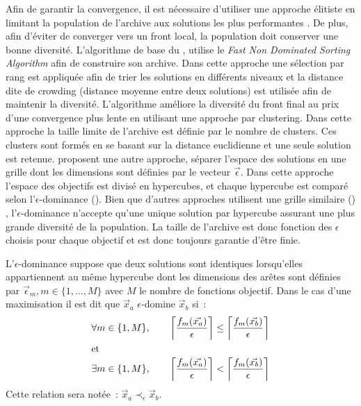 Afin de garantir la convergence, il est nécessaire d’utiliser une approche élitiste
en limitant la population de l’archive aux solutions les plus performantes \parencite{Zitzler2000173}.
De plus, afin d’éviter de converger vers un front local, la population doit conserver
une bonne diversité.
L’algorithme de base du  \parencite{Deb2002182}, utilise le \textit{Fast
Non Dominated Sorting Algorithm} afin de construire son archive. Dans cette approche une
sélection par rang est appliquée afin de trier les solutions en différents niveaux et la
distance dite de crowding (distance moyenne entre deux solutions) est utilisée afin de
maintenir la diversité. L’algorithme  améliore la diversité du
front final au prix d’une convergence plus lente en utilisant une approche par clustering.
Dans cette approche la taille limite de l’archive est définie par le nombre de clusters.
Ces clusters sont formés en se basant sur la distance euclidienne et une seule solution
est retenue.
\textcite{Laumanns2002263} proposent une autre approche, séparer l’espace des solutions en une
grille dont les dimensions sont définies par le vecteur $\vec{\epsilon}$. Dans cette
approche l’espace des objectifs est divisé en hypercubes, et chaque hypercube est comparé
selon l’$\epsilon$-dominance (). Bien que d’autres
approches utilisent une grille similaire () \parencite{Knowles2000149},
l’$\epsilon$-dominance n’accepte qu’une unique solution par hypercube assurant une plus
grande diversité de la population. La taille de l’archive est donc fonction des $\epsilon$
choisis pour chaque objectif et est donc toujours garantie d’être finie.


\begin{Def}\label{def:eps_dominance}
L’$\epsilon$-dominance suppose que deux solutions sont identiques lorsqu’elles appartiennent
au même hypercube dont les dimensions des arêtes sont définies par
$\vec{\epsilon}_{m}, m \in \{1, \dotsc, M\}$ avec $M$ le nombre de fonctions objectif.
Dans le cas d’une maximisation il est dit que $\vec{x}_{a}$ $\epsilon$-domine $\vec{x}_{b}$ si~:
\begin{align*}
  \forall m \in \{1, M\}, \qquad
  \left\lceil\frac{f_{m}(\vec{x_{a}})}{\epsilon}\right\rceil &\leq
  \left\lceil\frac{f_{m}(\vec{x_{b}})}{\epsilon}\right\rceil  \\
  \intertext{et}
  \exists m \in \{1, M\}, \qquad
  \left\lceil\frac{f_{m}(\vec{x_{a}})}{\epsilon}\right\rceil &<
  \left\lceil\frac{f_{m}(\vec{x_{b}})}{\epsilon}\right\rceil  \\
\end{align*}
Cette relation sera notée~: $\vec{x}_{a} \prec_{\epsilon} \vec{x}_{b}$.
\end{Def}

